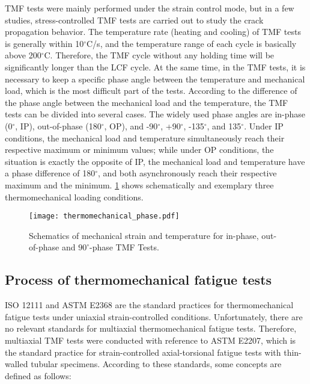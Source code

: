 TMF tests were mainly performed under the strain control mode, but in a few studies, stress-controlled TMF tests are carried out to study the crack propagation behavior.
The temperature rate (heating and cooling) of TMF tests is generally within 10$^\circ$C/s, and the temperature range of each cycle is basically above 200$^\circ$C. Therefore, the TMF cycle without any holding time will be significantly longer than the LCF cycle. At the same time, in the TMF tests, it is necessary to keep a specific phase angle between the temperature and mechanical load, which is the most difficult part of the tests. According to the difference of the phase angle between the mechanical load and the temperature, the TMF tests can be divided into several cases. The widely used phase angles are in-phase (0$^\circ$, IP), out-of-phase (180$^\circ$, OP), and -90$^\circ$, +90$^\circ$, -135$^\circ$, and 135$^\circ$. Under IP conditions, the mechanical load and temperature simultaneously reach their respective maximum or minimum values; while under OP conditions, the situation is exactly the opposite of IP, the mechanical load and temperature have a phase difference of 180$^\circ$, and both asynchronously reach their respective maximum and the minimum. \ref{Fig:thermomechanical_phase} shows schematically and exemplary three thermomechanical loading conditions.

\begin{figure}[!htp]
  \centering
  \texttt{[image: thermomechanical\_phase.pdf]}
  \caption{Schematics of mechanical strain and temperature for in-phase, out-of-phase and $90^\circ$-phase TMF Tests.}
  \label{Fig:thermomechanical_phase}
\end{figure}

\subsection{Process of thermomechanical fatigue tests}
\noindent
ISO 12111 and ASTM E2368\cite{ASTME2005} are the standard practices for thermomechanical fatigue tests under uniaxial strain-controlled conditions.
Unfortunately, there are no relevant standards for multiaxial thermomechanical fatigue tests.
Therefore, multiaxial TMF tests were conducted with reference to ASTM E2207, which is the standard practice for strain-controlled axial-torsional fatigue tests with thin-walled tubular specimens.
According to these standards, some concepts are defined as follows:

